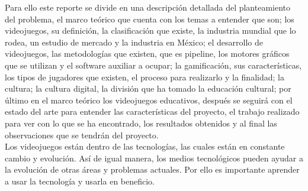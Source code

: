 Para ello este reporte se divide en una descripción detallada del planteamiento del problema, el marco teórico que cuenta con los temas a entender que son; los videojuegos, su definición, la clasificación que existe, la industria mundial que lo rodea, un estudio de mercado y la industria en México; el desarrollo de videojuegos, las metodologías que existen, que es pipeline, los motores gráficos que se utilizan y el software auxiliar a ocupar; la gamificación, sus características, los tipos de jugadores que existen, el proceso para realizarlo y la finalidad; la cultura; la cultura digital, la división que ha tomado la educación cultural; por último en el marco teórico los videojuegos educativos, después se seguirá con el estado del arte para entender las características del proyecto, el trabajo realizado para ver con lo que se ha encontrado, los resultados obtenidos y al final las observaciones que se tendrán del proyecto.
\\[1pt]

Los videojuegos están dentro de las tecnologías, las cuales están en constante cambio y evolución. Así de igual manera, los medios tecnológicos pueden ayudar a la evolución de otras áreas y problemas actuales. Por ello es importante aprender a usar la tecnología y usarla en beneficio.
\\[1pt]